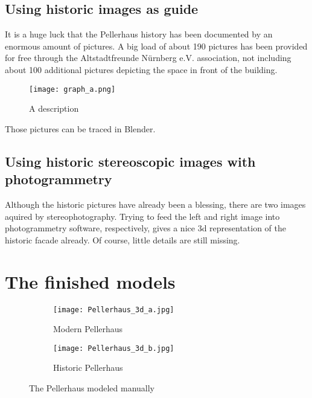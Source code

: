 \subsection{Using historic images as guide}

It is a huge luck that the Pellerhaus history has been documented by an enormous amount of pictures. A big load of about 190 pictures has been provided for free through the Altstadtfreunde Nürnberg e.V. association, not including about 100 additional pictures depicting the space in front of the building.


\begin{figure}[h]
	\centering
	\texttt{[image: graph\_a.png]}
	\caption{A description}
	\label{fig:something}
\end{figure}

Those pictures can be traced in Blender.

\subsection{Using historic stereoscopic images with photogrammetry}

Although the historic pictures have already been a blessing, there are two images aquired by stereophotography. Trying to feed the left and right image into photogrammetry software, respectively, gives a nice 3d representation of the historic facade already. Of course, little details are still missing.

\section{The finished models}



\begin{figure}[h]
	\centering
	\begin{subfigure}[b]{0.45\textwidth}
		\centering
		\texttt{[image: Pellerhaus\_3d\_a.jpg]}
		\caption{Modern Pellerhaus}
		\label{fig:pellerhaus_3d_modern}
	\end{subfigure}
	\hfill
	\begin{subfigure}[b]{0.45\textwidth}
		\centering
		\texttt{[image: Pellerhaus\_3d\_b.jpg]}
		\caption{Historic Pellerhaus}
		\label{fig:pellerhaus_3d_historic}
	\end{subfigure}
	\caption{The Pellerhaus modeled manually}
	\label{fig:pellerhaus_3d_models}
\end{figure}



